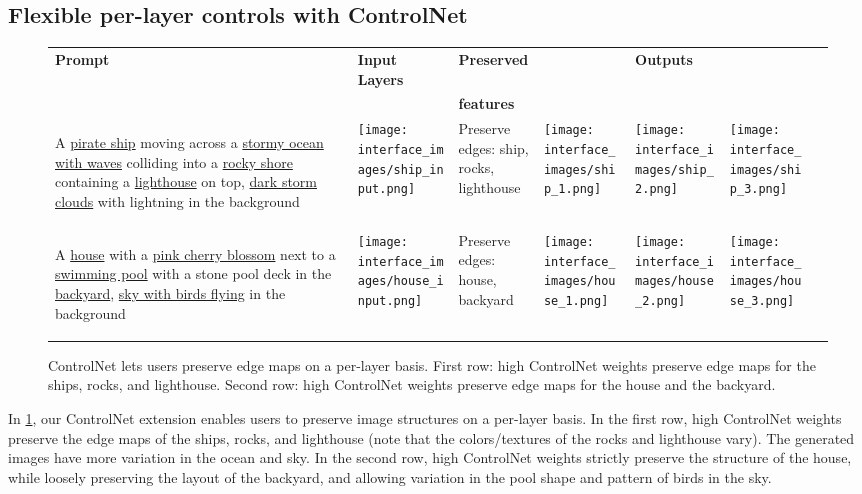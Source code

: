 \subsection{Flexible per-layer controls with ControlNet} \label{exp:ControlNet}
\vspace{-0.5em}

\begin{figure}
\begin{adjustbox}{max size={\linewidth}{\textheight}}
    \begin{tabular}[t]{p{.32\linewidth}p{.32\linewidth}|p{.32\linewidth}|p{.32\linewidth}p{.32\linewidth}p{.32\linewidth}p{.32\linewidth}}
        \hfil\textbf{Prompt} & \hfil\textbf{Input Layers} & \hfil\textbf{Preserved} & & \hfil\textbf{Outputs} & \\ 
            & & \hfil\textbf{features} & & & \\ 
    \hline
    {\begin{tiny}A \ul{pirate ship} moving across a \ul{stormy ocean with waves} colliding into a \ul{rocky shore} containing a \ul{lighthouse} on top, \ul{dark storm clouds} with lightning in the background\end{tiny}}& \texttt{[image: interface\_images/ship\_input.png]}
    & Preserve edges: ship, rocks, lighthouse & \texttt{[image: interface\_images/ship\_1.png]} & \texttt{[image: interface\_images/ship\_2.png]} & \texttt{[image: interface\_images/ship\_3.png]} \\
    \begin{tiny}A \ul{house} with a \ul{pink cherry blossom} next to a \ul{swimming pool} with a stone pool deck in the \ul{backyard}, \ul{sky with birds flying} in the background\end{tiny} & \texttt{[image: interface\_images/house\_input.png]}
    & Preserve edges: house, backyard & \texttt{[image: interface\_images/house\_1.png]} & \texttt{[image: interface\_images/house\_2.png]} & \texttt{[image: interface\_images/house\_3.png]} \\
    \end{tabular}
\end{adjustbox}
\caption{ControlNet lets users preserve edge maps on a per-layer basis. First row: high ControlNet weights preserve edge maps for the ships, rocks, and lighthouse. Second row: high ControlNet weights preserve edge maps for the house and the backyard.}
\label{fig:controlnet}
\end{figure}

In \cref{fig:controlnet}, our ControlNet extension enables users to preserve image structures on a per-layer basis. In the first row, high ControlNet weights preserve the edge maps of the ships, rocks, and lighthouse (note that the colors/textures of the rocks and lighthouse vary). The generated images have more variation in the ocean and sky. In the second row, high ControlNet weights strictly preserve the structure of the house, while loosely preserving the layout of the backyard, and allowing variation in the pool shape and pattern of birds in the sky. 

